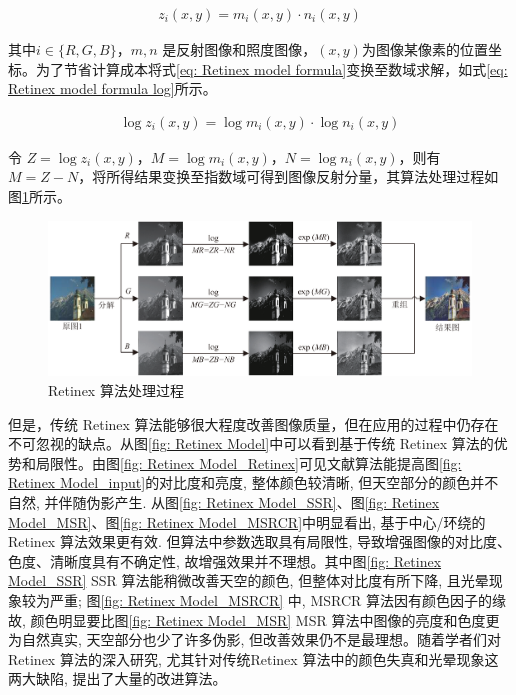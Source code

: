 \documentclass[a4paper]{ctexart}
\begin{document}
	\begin{equation}
		\begin{aligned}
			z_i\left(x,y\right) = m_i\left(x,y\right) \cdot n_i\left(x,y\right)
		\end{aligned}
		\label{eq: Retinex model formula}
	\end{equation}
	
	其中$i \in \{R, G, B\}$，$m,n$ 是反射图像和照度图像，$(x,y)$为图像某像素的位置坐标。为了节省计算成本将式\ref{eq: Retinex model formula}变换至数域求解，如式\ref{eq: Retinex model formula log}所示。
	
	\begin{equation}
		\begin{aligned}
			\log z_i\left(x,y\right) = \log m_i\left(x,y\right) \cdot  \log n_i\left(x,y\right)
		\end{aligned}
		\label{eq: Retinex model formula log}
	\end{equation}
	
	令 $Z = \log z_i \left(x, y\right)$，$M = \log m_i \left(x, y\right)$，$N = \log n_i \left(x, y\right)$，则有 $M = Z - N$，将所得结果变换至指数域可得到图像反射分量，其算法处理过程如图\ref{fig: Retinex model}所示。
	
	\begin{figure}[htb]
		\centering 
		\includegraphics[width=\columnwidth]{picture/LLIE/Retinex Model/Retinex Model}
		\caption{
			\label{fig: Retinex model} 
			Retinex 算法处理过程
		}
	\end{figure}
	
	但是，传统 Retinex 算法能够很大程度改善图像质量，但在应用的过程中仍存在不可忽视的缺点。从图\ref{fig: Retinex Model}中可以看到基于传统 Retinex 算法的优势和局限性。由图\ref{fig: Retinex Model_Retinex}可见文献\cite{cooper2004analysis}算法能提高图\ref{fig: Retinex Model_input}的对比度和亮度, 整体颜色较清晰, 但天空部分的颜色并不自然, 并伴随伪影产生. 从图\ref{fig: Retinex Model_SSR}、图\ref{fig: Retinex Model_MSR}、图\ref{fig: Retinex Model_MSRCR}中明显看出, 基于中心/环绕的 Retinex 算法效果更有效. 但算法中参数选取具有局限性, 导致增强图像的对比度、色度、清晰度具有不确定性, 故增强效果并不理想。其中图\ref{fig: Retinex Model_SSR} SSR 算法能稍微改善天空的颜色, 但整体对比度有所下降, 且光晕现象较为严重; 图\ref{fig: Retinex Model_MSRCR} 中, MSRCR 算法因有颜色因子的缘故, 颜色明显要比图\ref{fig: Retinex Model_MSR} MSR 算法中图像的亮度和色度更为自然真实, 天空部分也少了许多伪影, 但改善效果仍不是最理想\cite{202013}。随着学者们对Retinex 算法的深入研究, 尤其针对传统Retinex 算法中的颜色失真和光晕现象这两大缺陷, 提出了大量的改进算法。
	
\end{document}
